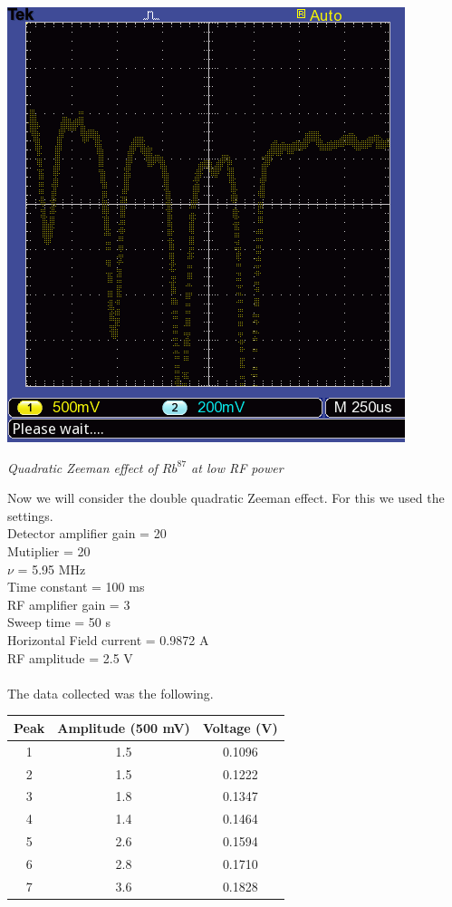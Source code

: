 \documentclass[twocolumn]{article}
\begin{document}
\includegraphics[width=\linewidth]{pictures/rb87-low-raw.png}
\caption{\textit{Quadratic Zeeman effect of $Rb^{87}$ at low RF power \\ }}
\justify
Now we will consider the double quadratic Zeeman effect. For this we used the 
settings.
\\
Detector amplifier gain = 20 \\
Mutiplier = 20 \\
$\nu$ = 5.95 MHz \\
Time constant = 100 ms \\
RF amplifier gain = 3 \\
Sweep time = 50 s \\
Horizontal Field current = 0.9872 A \\
RF amplitude = 2.5 V \\
\\
The data collected was the following.
\begin{minipage}{\linewidth}
\center
\begin{tabular}{|c|c|c|}
\hline
Peak & Amplitude (500 mV) & Voltage (V) \\ \hline
1 & 1.5 & 0.1096 \\ \hline
2 & 1.5 & 0.1222 \\ \hline
3 & 1.8 & 0.1347 \\ \hline
4 & 1.4 & 0.1464 \\ \hline
5 & 2.6 & 0.1594 \\ \hline
6 & 2.8 & 0.1710 \\ \hline
7 & 3.6 & 0.1828 \\ \hline
\end{tabular}
\label{tbl:9}
\end{minipage}
\end{document}

